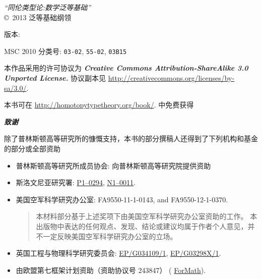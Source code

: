 \hbox{}
\vfill

{\small
\noindent
\emph{``同伦类型论:数学泛等基础''}\\
\copyright\ 2013 泛等基础纲领

\medskip
\noindent
版本: \texttt{\OPTversion}

\medskip
\noindent
MSC 2010 分类号:
\texttt{03-02},
\texttt{55-02},
\texttt{03B15}

\bigskip
\footnotesize

\noindent
本作品采用的许可协议为
\textbf{\emph{Creative Commons Attribution-ShareAlike 3.0 Unported License.}}
%
协议副本见
\url{http://creativecommons.org/licenses/by-sa/3.0/}.

\bigskip

\noindent
本书可在 \url{http://homotopytypetheory.org/book/}. 中免费获得

\bigskip

\noindent
\emph{\textbf{\small 致谢}}

\medskip

\noindent
除了普林斯顿高等研究所的慷慨支持，本书的部分撰稿人还得到了下列机构和基金的部分或全部资助
%
\begin{itemize}
\item 普林斯顿高等研究所成员协会: 向普林斯顿高等研究院提供资助 %
\item 斯洛文尼亚研究署:  %
\href{http://www.sicris.si/search/prg.aspx?id=6120}{P1--0294},
\href{http://www.sicris.si/search/prj.aspx?id=7109}{N1--0011}.

\item 美国空军科学研究办公室:
  FA9550-11-1-0143, and %
  FA9550-12-1-0370.  %
  {
    \setlength{\parskip}{0pt}
    \begin{quote}
      \noindent\scriptsize
      本材料部分基于上述奖项下由美国空军科学研究办公室资助的工作。
      本出版物中表达的任何观点、发现、结论或建议均属于作者个人意见，并不一定反映美国空军科学研究办公室的立场。
    \end{quote}
  }

\item 英国工程与物理科学研究委员会: %
   \href{http://gow.epsrc.ac.uk/NGBOViewGrant.aspx?GrantRef=EP/G034109/1}{EP/G034109/1}, %
   \href{http://gow.epsrc.ac.uk/NGBOViewGrant.aspx?GrantRef=EP/G03298X/1}{EP/G03298X/1}. %

\item 由欧盟第七框架计划资助（资助协议号 243847） (%
\href{http://wiki.portal.chalmers.se/cse/pmwiki.php/ForMath/ForMath/}{ForMath}). %


\end{itemize}}
